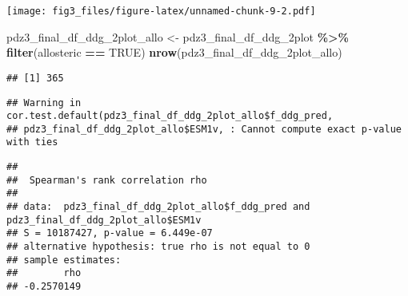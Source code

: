 \documentclass[
]{article}
\newenvironment{Shaded}{\begin{snugshade}}{\end{snugshade}}
\newcommand{\AttributeTok}[1]{\textcolor[rgb]{0.13,0.29,0.53}{#1}}
\newcommand{\CommentTok}[1]{\textcolor[rgb]{0.56,0.35,0.01}{\textit{#1}}}
\newcommand{\ConstantTok}[1]{\textcolor[rgb]{0.56,0.35,0.01}{#1}}
\newcommand{\FunctionTok}[1]{\textcolor[rgb]{0.13,0.29,0.53}{\textbf{#1}}}
\newcommand{\NormalTok}[1]{#1}
\newcommand{\OtherTok}[1]{\textcolor[rgb]{0.56,0.35,0.01}{#1}}
\newcommand{\SpecialCharTok}[1]{\textcolor[rgb]{0.81,0.36,0.00}{\textbf{#1}}}
\newcommand{\StringTok}[1]{\textcolor[rgb]{0.31,0.60,0.02}{#1}}
\begin{document}
\texttt{[image: fig3\_files/figure-latex/unnamed-chunk-9-2.pdf]}

\begin{Shaded}
\begin{Highlighting}[]
\NormalTok{pdz3\_final\_df\_ddg\_2plot\_allo }\OtherTok{\textless{}{-}}\NormalTok{ pdz3\_final\_df\_ddg\_2plot }\SpecialCharTok{\%\textgreater{}\%} \FunctionTok{filter}\NormalTok{(allosteric }\SpecialCharTok{==} \ConstantTok{TRUE}\NormalTok{)}
\FunctionTok{nrow}\NormalTok{(pdz3\_final\_df\_ddg\_2plot\_allo)}
\end{Highlighting}
\end{Shaded}

\begin{verbatim}
## [1] 365
\end{verbatim}

\begin{Shaded}
\end{Shaded}

\begin{verbatim}
## Warning in cor.test.default(pdz3_final_df_ddg_2plot_allo$f_ddg_pred,
## pdz3_final_df_ddg_2plot_allo$ESM1v, : Cannot compute exact p-value with ties
\end{verbatim}

\begin{verbatim}
## 
##  Spearman's rank correlation rho
## 
## data:  pdz3_final_df_ddg_2plot_allo$f_ddg_pred and pdz3_final_df_ddg_2plot_allo$ESM1v
## S = 10187427, p-value = 6.449e-07
## alternative hypothesis: true rho is not equal to 0
## sample estimates:
##        rho 
## -0.2570149
\end{verbatim}
\end{document}
